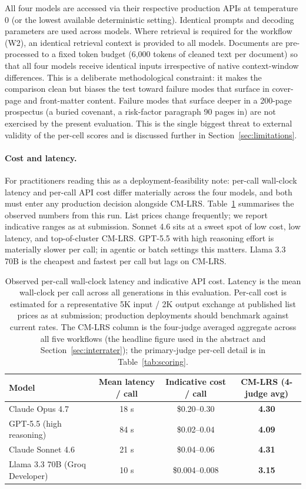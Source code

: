 \documentclass[11pt]{article}
\begin{document}
All four models are accessed via their respective production APIs at temperature 0 (or the lowest available deterministic setting). Identical prompts and decoding parameters are used across models. Where retrieval is required for the workflow (W2), an identical retrieval context is provided to all models. Documents are pre-processed to a fixed token budget (6,000 tokens of cleaned text per document) so that all four models receive identical inputs irrespective of native context-window differences. This is a deliberate methodological constraint: it makes the comparison clean but biases the test toward failure modes that surface in cover-page and front-matter content. Failure modes that surface deeper in a 200-page prospectus (a buried covenant, a risk-factor paragraph 90 pages in) are not exercised by the present evaluation. This is the single biggest threat to external validity of the per-cell scores and is discussed further in Section~\ref{sec:limitations}.

\paragraph{Cost and latency.} For practitioners reading this as a deployment-feasibility note: per-call wall-clock latency and per-call API cost differ materially across the four models, and both must enter any production decision alongside CM-LRS. Table~\ref{tab:cost} summarises the observed numbers from this run. List prices change frequently; we report indicative ranges as at submission. Sonnet 4.6 sits at a sweet spot of low cost, low latency, and top-of-cluster CM-LRS. GPT-5.5 with high reasoning effort is materially slower per call; in agentic or batch settings this matters. Llama 3.3 70B is the cheapest and fastest per call but lags on CM-LRS.

\begin{table}[h]
\centering
\caption{Observed per-call wall-clock latency and indicative API cost. Latency is the mean wall-clock per call across all generations in this evaluation. Per-call cost is estimated for a representative 5K input / 2K output exchange at published list prices as at submission; production deployments should benchmark against current rates. The CM-LRS column is the four-judge averaged aggregate across all five workflows (the headline figure used in the abstract and Section~\ref{sec:interrater}); the primary-judge per-cell detail is in Table~\ref{tab:scoring}.}
\label{tab:cost}
\small
\begin{tabular}{@{}lcc>{\bfseries}c@{}}
\toprule
\textbf{Model} & \textbf{Mean latency / call} & \textbf{Indicative cost / call} & \textbf{CM-LRS (4-judge avg)} \\
\midrule
Claude Opus 4.7 & 18 s & \$0.20--0.30 & 4.30 \\
GPT-5.5 (high reasoning) & 84 s & \$0.02--0.04 & 4.09 \\
Claude Sonnet 4.6 & 21 s & \$0.04--0.06 & 4.31 \\
Llama 3.3 70B (Groq Developer) & 10 s & \$0.004--0.008 & 3.15 \\
\bottomrule
\end{tabular}
\end{table}
\end{document}
